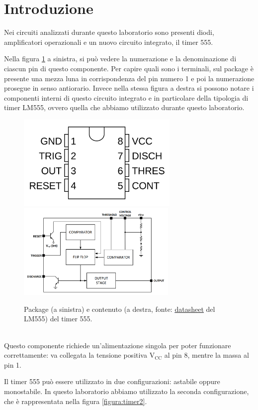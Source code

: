 \documentclass{report}
\begin{document}
\section*{Introduzione}
Nei circuiti analizzati durante questo laboratorio sono presenti diodi, amplificatori operazionali e un nuovo circuito integrato, il timer 555.\par
Nella figura \ref{figura:timer1} a sinistra, si può vedere la numerazione e la denominazione di ciascun pin di questo componente. Per capire quali sono i terminali, sul package è presente una mezza luna in corrispondenza del pin numero 1 e poi la numerazione prosegue in senso antiorario. Invece nella stessa figura a destra si possono notare i componenti interni di questo circuito integrato e in particolare della tipologia di timer LM555, ovvero quella che abbiamo utilizzato durante questo laboratorio.
\begin{figure}[h]
	\centering
	\includegraphics[height=4.6cm]{immagini/timer1}
	\includegraphics[height=4.6cm]{immagini/timer2}
	\caption{Package (a sinistra) e contenuto (a destra, fonte: \textcolor{blue}{\underline{\href{https://www.ti.com/lit/ds/symlink/lm555.pdf?ts=1667144089940&ref_url=https\%253A\%252F\%252Fwww.ti.com\%252Fproduct\%252FLM555}{datasheet}}} del LM555) del timer 555.}
	\label{figura:timer1}
\end{figure}
\\Questo componente richiede un'alimentazione singola per poter funzionare correttamente: va collegata la tensione positiva $\mathrm{V_{CC}}$ al pin 8, mentre la massa al pin 1.\par
Il timer 555 può essere utilizzato in due configurazioni: astabile oppure monostabile. In questo laboratorio abbiamo utilizzato la seconda configurazione, che è rappresentata nella figura \ref{figura:timer2}.
\end{document}
